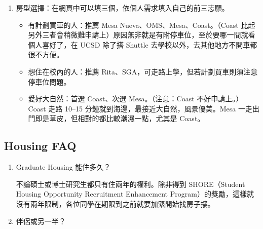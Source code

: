 \documentclass[10pt,a4paper]{book}
\begin{document}
\begin{CJK}{UTF8}{bkai}
\begin{enumerate}
\item 房型選擇：在網頁中可以填三個，依個人需求填入自己的前三志願。

\begin{itemize}
\item 有計劃買車的人：推薦 Mesa Nueva、OMS、Mesa、Coast。（Coast 比起另外三者會稍微難申請上）原因無非就是有附停車位，至於要哪一間就看個人喜好了，在 UCSD 除了搭 Shuttle 去學校以外，去其他地方不開車都很不方便。

\item 想住在校內的人：推薦 Rita、SGA，可走路上學，但若計劃買車則須注意停車位問題。

\item 愛好大自然：首選 Coast、次選 Mesa。（注意：Coast 不好申請上。）Coast 走路 10--15 分鐘就到海邊，最接近大自然，風景優美。Mesa 一走出門即是草皮，但相對的都比較潮濕一點，尤其是 Coast。
\end{itemize}
\end{enumerate}

\subsection{Housing FAQ}

\begin{enumerate}
\item Graduate Housing 能住多久？

不論碩士或博士研究生都只有住兩年的權利。除非得到 SHORE（Student Housing Opportunity Recruitment Enhancement Program）的獎勵，這樣就沒有兩年限制，各位同學在期限到之前就要加緊開始找房子摟。

\item 伴侶或另一半？


\end{enumerate}
\end{CJK}
\end{document}

